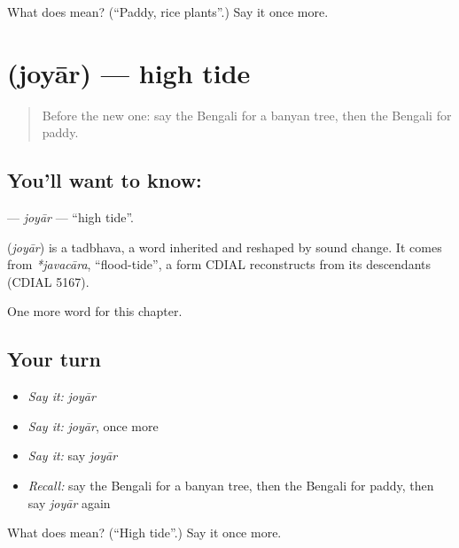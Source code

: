 \begin{tcolorbox}[breakable,colback=teal!4,colframe=teal!35!black,title={Before you move on}]
What does  mean? (\textquotedblleft{}Paddy, rice plants\textquotedblright{}.) Say it once more.
\end{tcolorbox}
\section[\texorpdfstring{\bn{জোয়ার} (joyār)}{জোয়ার (joyār)}]{ (joyār) — high tide}

\label{lesson:BN-C171-joyar}



\begin{quote}
Before the new one: say the Bengali for a banyan tree, then the Bengali for paddy.
\end{quote}

\subsection*{You'll want to know: }
\textbf{} — \emph{joyār} — \textquotedblleft{}high tide\textquotedblright{}.

\begin{cousinweb}
\textbf{} (\emph{joyār}) is a tadbhava, a word inherited and reshaped by sound change. It comes from \emph{*javacāra}, \textquotedblleft{}flood-tide\textquotedblright{}, a form CDIAL reconstructs from its descendants (CDIAL 5167).
\end{cousinweb}

\begin{grammarlens}[title={What you've built}]
One more word for this chapter.
\end{grammarlens}

\subsection*{Your turn}
\begin{itemize}
\raggedright
  \item \emph{Say it:} \emph{joyār}
  \item \emph{Say it:} \emph{joyār}, once more
  \item \emph{Say it:} say \emph{joyār}
  \item \emph{Recall:} say the Bengali for a banyan tree, then the Bengali for paddy, then say \emph{joyār} again
\end{itemize}

\begin{tcolorbox}[breakable,colback=teal!4,colframe=teal!35!black,title={Before you move on}]
What does  mean? (\textquotedblleft{}High tide\textquotedblright{}.) Say it once more.
\end{tcolorbox}
